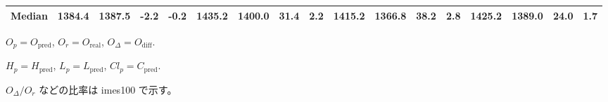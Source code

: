 \begin{threeparttable}
{\begin{tabular}{lrrrrrrrrrrrrrrrr}
 Median & 1384.4 & 1387.5 &       -2.2 &           -0.2 & 1435.2 & 1400.0 &       31.4 &            2.2 & 1415.2 & 1366.8 &       38.2 &            2.8 & 1425.2 & 1389.0 &        24.0 &              1.7 \\
\bottomrule
\end{tabular}
}
\begin{tablenotes}\footnotesize
\item $O_p=O_{\text{pred}}$, $O_r=O_{\text{real}}$, $O_\Delta=O_{\text{diff}}$.
\item $H_p=H_{\text{pred}}$, $L_p=L_{\text{pred}}$, $Cl_p=C_{\text{pred}}$.
\item $O_\Delta/O_r$ などの比率は 	imes100 で示す。
\end{tablenotes}
\end{threeparttable}
\endgroup
